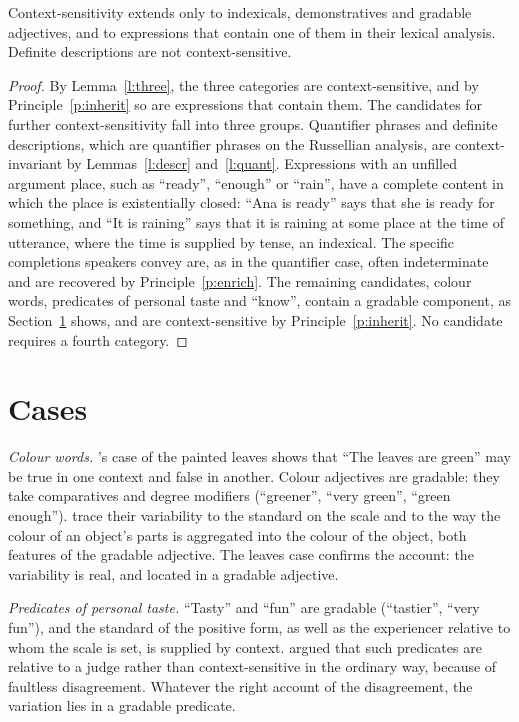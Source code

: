 \documentclass{situationist-preprint}
\begin{document}
\begin{theorem}\label{t:scope}
Context-sensitivity extends only to indexicals, demonstratives and gradable adjectives, and to expressions that contain one of them in their lexical analysis. Definite descriptions are not context-sensitive.
\end{theorem}

\begin{proof}
By Lemma~\ref{l:three}, the three categories are context-sensitive, and by Principle~\ref{p:inherit} so are expressions that contain them. The candidates for further context-sensitivity fall into three groups. Quantifier phrases and definite descriptions, which are quantifier phrases on the Russellian analysis, are context-invariant by Lemmas~\ref{l:descr} and~\ref{l:quant}. Expressions with an unfilled argument place, such as \enquote{ready}, \enquote{enough} or \enquote{rain}, have a complete content in which the place is existentially closed: \enquote{Ana is ready} says that she is ready for something, and \enquote{It is raining} says that it is raining at some place at the time of utterance, where the time is supplied by tense, an indexical. The specific completions speakers convey are, as in the quantifier case, often indeterminate and are recovered by Principle~\ref{p:enrich}. The remaining candidates, colour words, predicates of personal taste and \enquote{know}, contain a gradable component, as Section~\ref{s:cases} shows, and are context-sensitive by Principle~\ref{p:inherit}. No candidate requires a fourth category.
\end{proof}

\section{Cases}\label{s:cases}

\emph{Colour words.} \citet{Travis1997}'s case of the painted leaves shows that \enquote{The leaves are green} may be true in one context and false in another. Colour adjectives are gradable: they take comparatives and degree modifiers (\enquote{greener}, \enquote{very green}, \enquote{green enough}). \citet{KennedyMcNally2010} trace their variability to the standard on the scale and to the way the colour of an object's parts is aggregated into the colour of the object, both features of the gradable adjective. The leaves case confirms the account: the variability is real, and located in a gradable adjective.

\emph{Predicates of personal taste.} \enquote{Tasty} and \enquote{fun} are gradable (\enquote{tastier}, \enquote{very fun}), and the standard of the positive form, as well as the experiencer relative to whom the scale is set, is supplied by context. \citet{Lasersohn2005} argued that such predicates are relative to a judge rather than context-sensitive in the ordinary way, because of faultless disagreement. Whatever the right account of the disagreement, the variation lies in a gradable predicate.
\end{document}
